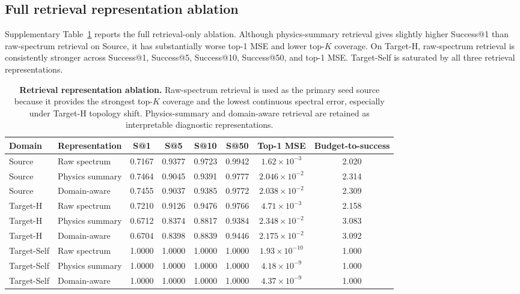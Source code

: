 \documentclass[final,1p,times]{elsarticle}
\begin{document}
\subsection{Full retrieval representation ablation}

Supplementary Table~\ref{tab:si_retrieval_representation} reports the full retrieval-only ablation. Although physics-summary retrieval gives slightly higher Success@1 than raw-spectrum retrieval on Source, it has substantially worse top-1 MSE and lower top-$K$ coverage. On Target-H, raw-spectrum retrieval is consistently stronger across Success@1, Success@5, Success@10, Success@50, and top-1 MSE. Target-Self is saturated by all three retrieval representations.

\begin{table}[htbp!]
\centering
\caption{\textbf{Retrieval representation ablation.}
Raw-spectrum retrieval is used as the primary seed source because it provides the strongest top-$K$ coverage and the lowest continuous spectral error, especially under Target-H topology shift. Physics-summary and domain-aware retrieval are retained as interpretable diagnostic representations.}
\label{tab:si_retrieval_representation}
\footnotesize
\setlength{\tabcolsep}{4.2pt}
\renewcommand{\arraystretch}{1.12}
\begin{tabular}{llcccccc}
\toprule
Domain & Representation & S@1 & S@5 & S@10 & S@50 & Top-1 MSE & Budget-to-success \\
\midrule
Source & Raw spectrum & 0.7167 & 0.9377 & 0.9723 & 0.9942 & $1.62\times10^{-3}$ & 2.020 \\
Source & Physics summary & 0.7464 & 0.9045 & 0.9391 & 0.9777 & $2.046\times10^{-2}$ & 2.314 \\
Source & Domain-aware & 0.7455 & 0.9037 & 0.9385 & 0.9772 & $2.038\times10^{-2}$ & 2.309 \\
\midrule
Target-H & Raw spectrum & 0.7210 & 0.9126 & 0.9476 & 0.9766 & $4.71\times10^{-3}$ & 2.158 \\
Target-H & Physics summary & 0.6712 & 0.8374 & 0.8817 & 0.9384 & $2.348\times10^{-2}$ & 3.083 \\
Target-H & Domain-aware & 0.6704 & 0.8398 & 0.8839 & 0.9446 & $2.175\times10^{-2}$ & 3.092 \\
\midrule
Target-Self & Raw spectrum & 1.0000 & 1.0000 & 1.0000 & 1.0000 & $1.93\times10^{-10}$ & 1.000 \\
Target-Self & Physics summary & 1.0000 & 1.0000 & 1.0000 & 1.0000 & $4.18\times10^{-9}$ & 1.000 \\
Target-Self & Domain-aware & 1.0000 & 1.0000 & 1.0000 & 1.0000 & $4.37\times10^{-9}$ & 1.000 \\
\bottomrule
\end{tabular}
\end{table}
\end{document}
